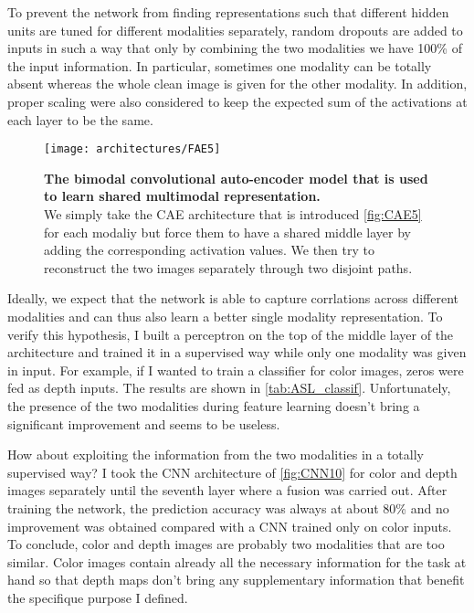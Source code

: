 To prevent the network from finding representations such that different
hidden units are tuned for different modalities separately, random
dropouts are added to inputs in such a way that only by combining the
two modalities we have 100\% of the input information. In particular,
sometimes one modality can be totally absent whereas the whole clean
image is given for the other modality. In addition, proper scaling were
also considered to keep the expected sum of the activations at each layer
to be the same.

\begin{figure}[H]
  \centering
  \texttt{[image: architectures/FAE5]}
  \caption{%
    \textbf{The bimodal convolutional auto-encoder model that is
      used to learn shared multimodal representation.}\\[0.1em]
    We simply take the CAE architecture that is introduced
      \autoref{fig:CAE5} for each modaliy but force them to have a
      shared middle layer by adding the corresponding activation values.
      We then try to reconstruct the two images separately through
      two disjoint paths.}
  \label{fig:FAE5}
\end{figure}

Ideally, we expect that the network is able to capture corrlations
across different modalities and can thus also learn a better single
modality representation. To verify this hypothesis, I built a perceptron
on the top of the middle layer of the architecture and trained it
in a supervised way while only one modality was given in input. For example,
if I wanted to train a classifier for color images, zeros were fed as
depth inputs. The results are shown in \autoref{tab:ASL_classif}.
Unfortunately, the presence of the two modalities during feature
learning doesn't bring a significant improvement and seems to be useless.

How about exploiting the information from the two modalities in a
totally supervised way? I took the CNN architecture of \autoref{fig:CNN10}
for color and depth images separately until the seventh layer where
a fusion was carried out. After training the network, the prediction
accuracy was always at about 80\% and no improvement was obtained compared
with a CNN trained only on color inputs. To conclude, color and depth
images are probably two modalities that are too similar. Color images
contain already all the necessary information for the task at hand so
that depth maps don't bring any supplementary information that benefit
the specifique purpose I defined.

